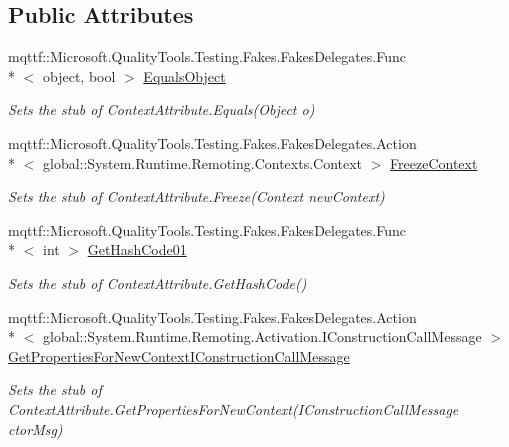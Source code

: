 \subsection*{Public Attributes}
\begin{DoxyCompactItemize}
\item 
mqttf\-::\-Microsoft.\-Quality\-Tools.\-Testing.\-Fakes.\-Fakes\-Delegates.\-Func\\*
$<$ object, bool $>$ \hyperlink{class_system_1_1_runtime_1_1_remoting_1_1_contexts_1_1_fakes_1_1_stub_context_attribute_add1afd8c669daf73ee6096086af55547}{Equals\-Object}
\begin{DoxyCompactList}\small\item\em Sets the stub of Context\-Attribute.\-Equals(\-Object o)\end{DoxyCompactList}\item 
mqttf\-::\-Microsoft.\-Quality\-Tools.\-Testing.\-Fakes.\-Fakes\-Delegates.\-Action\\*
$<$ global\-::\-System.\-Runtime.\-Remoting.\-Contexts.\-Context $>$ \hyperlink{class_system_1_1_runtime_1_1_remoting_1_1_contexts_1_1_fakes_1_1_stub_context_attribute_ac11f52aafe6255acd4dfc63bb7e53b0a}{Freeze\-Context}
\begin{DoxyCompactList}\small\item\em Sets the stub of Context\-Attribute.\-Freeze(\-Context new\-Context)\end{DoxyCompactList}\item 
mqttf\-::\-Microsoft.\-Quality\-Tools.\-Testing.\-Fakes.\-Fakes\-Delegates.\-Func\\*
$<$ int $>$ \hyperlink{class_system_1_1_runtime_1_1_remoting_1_1_contexts_1_1_fakes_1_1_stub_context_attribute_a53c2f80fc312b8030ee6ca4c35db12b7}{Get\-Hash\-Code01}
\begin{DoxyCompactList}\small\item\em Sets the stub of Context\-Attribute.\-Get\-Hash\-Code()\end{DoxyCompactList}\item 
mqttf\-::\-Microsoft.\-Quality\-Tools.\-Testing.\-Fakes.\-Fakes\-Delegates.\-Action\\*
$<$ global\-::\-System.\-Runtime.\-Remoting.\-Activation.\-I\-Construction\-Call\-Message $>$ \hyperlink{class_system_1_1_runtime_1_1_remoting_1_1_contexts_1_1_fakes_1_1_stub_context_attribute_a0718837b88e46651d0df26e4ea136a62}{Get\-Properties\-For\-New\-Context\-I\-Construction\-Call\-Message}
\begin{DoxyCompactList}\small\item\em Sets the stub of Context\-Attribute.\-Get\-Properties\-For\-New\-Context(\-I\-Construction\-Call\-Message ctor\-Msg)\end{DoxyCompactList}\item 

\end{DoxyCompactItemize}
